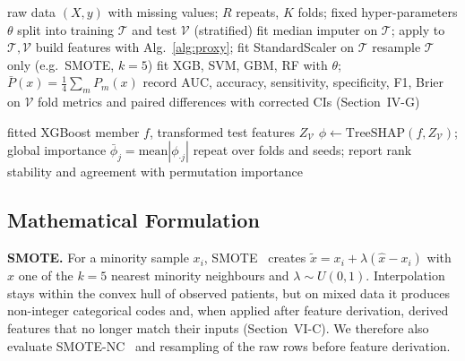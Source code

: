 \begin{algorithm}[!t]
\caption{Training and evaluation (repeated stratified CV)}
\label{alg:train}
\begin{algorithmic}[1]
\Require raw data $(X, y)$ with missing values; $R$ repeats, $K$ folds; fixed hyper-parameters $\theta$
  \State split into training $\mathcal{T}$ and test $\mathcal{V}$ (stratified)
  \State fit median imputer on $\mathcal{T}$; apply to $\mathcal{T}, \mathcal{V}$
  \State build features with Alg.~\ref{alg:proxy}; fit StandardScaler on $\mathcal{T}$
  \State resample $\mathcal{T}$ only (e.g.\ SMOTE, $k=5$)
  \State fit XGB, SVM, GBM, RF with $\theta$; $\bar P(x)=\frac14\sum_m P_m(x)$
  \State record AUC, accuracy, sensitivity, specificity, F1, Brier on $\mathcal{V}$
\EndFor
\State \Return fold metrics and paired differences with corrected CIs (Section~IV-G)
\end{algorithmic}
\end{algorithm}

\begin{algorithm}[!t]
\caption{Post-hoc interpretation (not used for prediction)}
\label{alg:shap}
\begin{algorithmic}[1]
\Require fitted XGBoost member $f$, transformed test features $Z_{\mathcal{V}}$
\State $\phi \gets \text{TreeSHAP}(f, Z_{\mathcal{V}})$; global importance $\bar\phi_j=\text{mean}|\phi_{\cdot j}|$
\State repeat over folds and seeds; report rank stability and agreement with permutation importance
\end{algorithmic}
\end{algorithm}

\subsection{Mathematical Formulation}
\textbf{SMOTE.} For a minority sample $x_i$, SMOTE~\cite{chawla2002} creates $\tilde x = x_i + \lambda(\hat x - x_i)$ with $\hat x$ one of the $k=5$ nearest minority neighbours and $\lambda\sim U(0,1)$. Interpolation stays within the convex hull of observed patients, but on mixed data it produces non-integer categorical codes and, when applied after feature derivation, derived features that no longer match their inputs (Section~VI-C). We therefore also evaluate SMOTE-NC~\cite{chawla2002} and resampling of the raw rows before feature derivation.

